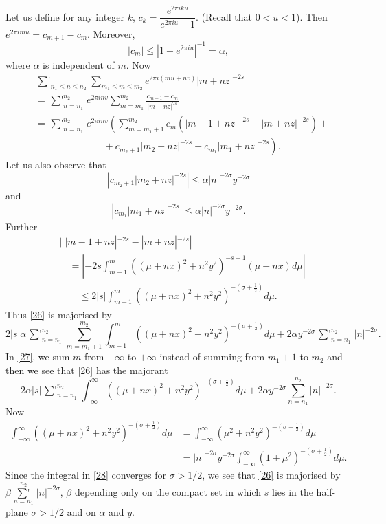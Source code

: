 Let us define for any integer $k$, $c_{k}=\dfrac{e^{2\pi iku}}{e^{2\pi
    iu}-1}$. (Recall that $0<u<1$). Then $e^{2\pi
  imu}=c_{m+1}-c_{m}$. Moreover,
$$
|c_{m}|\leq |1-e^{2\pi iu}|^{-1}=\alpha,
$$
where $\alpha$ is independent of $m$. Now
\begin{align*}
& \mathop{{\sum}'}_{n_{1}\leq n\leq n_{2}}\sum_{m_{1}\leq m\leq
  m_{2}}e^{2\pi i(mu+nv)}|m+nz|^{-2s}\\
&= \mathop{{\sum}'}^{n_{2}}_{n=n_{1}}e^{2\pi
    inv}\sum^{m_{2}}_{m=m_{1}}\frac{c_{m+1}-c_{m}}{|m+nz|^{2s}}\\
&= \mathop{{\sum}'}^{n_{2}}_{n=n_{1}}e^{2\pi
    inv}\left(\sum^{m_{2}}_{m=m_{1}+1}c_{m}(|m-1+nz|^{-2s}-|m+nz|^{-2s})+\right.\\
&\qquad
  \left.\phantom{\sum^{m_{2}}_{m=m_{1}+1}}+c_{m_{2}+1}|m_{2}+nz|^{-2s}-c_{m_{1}}|m_{1}+nz|^{-2s}\right).\tag{26}\label{26} 
\end{align*}\pageoriginale
Let us also observe that
$$
\left|c_{m_{2}+1}|m_{2}+nz|^{-2s}\right|\leq
\alpha|n|^{-2\sigma}y^{-2\sigma}
$$
and
$$
\left|c_{m_{1}}|m_{1}+nz|^{-2s}\right|\leq
\alpha|n|^{-2\sigma}y^{-2\sigma}. 
$$
Further
\begin{align*}
& |\; | m-1+nz|^{-2s}-|m+nz|^{-2s}|\\
&\quad
= \left|-2s\int^{m}_{m-1}((\mu+nx)^{2}+n^{2}y^{2})^{-s-1}(\mu+nx)d\mu\right|\\
&\qquad \leq
2|s|\int^{m}_{m-1}((\mu+nx)^{2}+n^{2}y^{2})^{-(\sigma+\frac{1}{2})}d \mu. 
\end{align*}
Thus \eqref{26} is majorised by
\begin{equation*}
2|s|\alpha
\mathop{{\sum}'}^{n_{2}}_{n=n_{1}}\sum^{m_{2}}_{m=m_{1}+1}\int^{m}_{m-1}((\mu+nx)^{2}+n^{2}y^{2})^{-(\sigma+\frac{1}{2})}d\mu+2\alpha 
y^{-2\sigma}\mathop{{\sum}'}^{n_{2}}_{n=n_{1}}|n|^{-2\sigma}.\tag{27}\label{27} 
\end{equation*}
In \eqref{27}, we sum $m$ from $-\infty$ to $+\infty$ instead of
summing from $m_{1}+1$ to $m_{2}$ and then we see that \eqref{26} has
the majorant
$$
2\alpha|s|\mathop{{\sum}'}^{n_{2}}_{n=n_{1}}\int^{\infty}_{-\infty}((\mu+nx)^{2}+n^{2}y^{2})^{-(\sigma+\frac{1}{2})}d\mu+2\alpha
y^{-2\sigma}\sum^{n_{2}}_{n=n_{1}}|n|^{-2\sigma}. 
$$
Now\pageoriginale
\begin{align*}
\int^{\infty}_{-\infty}((\mu+nx)^{2}+n^{2}y^{2})^{-(\sigma+\frac{1}{2})}d\mu
&=
\int^{\infty}_{-\infty}(\mu^{2}+n^{2}y^{2})^{-(\sigma+\frac{1}{2})}d\mu\\
&=
|n|^{-2\sigma}y^{-2\sigma}\int^{\infty}_{-\infty}(1+\mu^{2})^{-(\sigma+\frac{1}{2})}d\mu.\tag{28}\label{28} 
\end{align*}
Since the integral in \eqref{28} converges for $\sigma>1/2$, we see
that \eqref{26} is majorised by
$\beta\mathop{{\sum}'}\limits^{n_{2}}_{n=n_{1}}|n|^{-2\sigma}$, $\beta$ depending
only on the compact set in which $s$ lies in the half-plane
$\sigma>1/2$ and on $\alpha$ and $y$.

